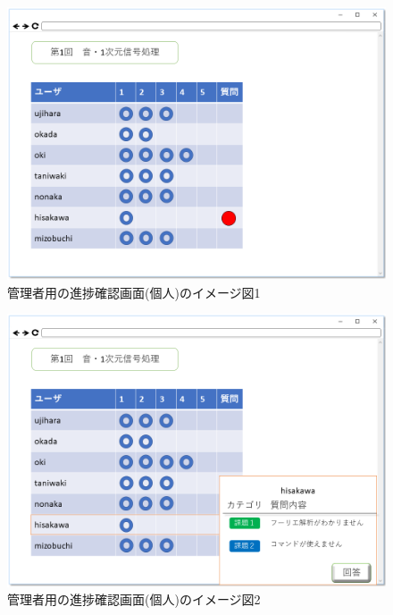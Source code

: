 \begin{figure}[htbp]
\begin{center}
  \includegraphics[width=1\linewidth,clip]{./img/sc_prog_check_one1.png}
  \caption{管理者用の進捗確認画面(個人)のイメージ図1}\label{fig:sc_prog_check_one1}
\end{center}
\end{figure}

\begin{figure}[htbp]
\begin{center}
  \includegraphics[width=1\linewidth,clip]{./img/sc_prog_check_one2.png}
  \caption{管理者用の進捗確認画面(個人)のイメージ図2}\label{fig:sc_prog_check_one2}
\end{center}
\end{figure}

